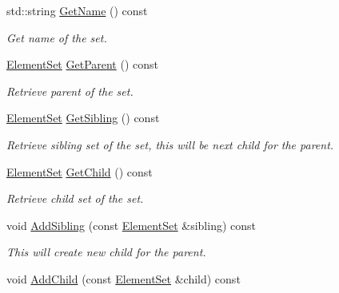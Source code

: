 \begin{DoxyCompactItemize}
\item 
\hypertarget{classINMOST_1_1ElementSet_ad40fe14ad7209c986897a8cd4560c6fd}{std\-::string \hyperlink{classINMOST_1_1ElementSet_ad40fe14ad7209c986897a8cd4560c6fd}{Get\-Name} () const }\label{classINMOST_1_1ElementSet_ad40fe14ad7209c986897a8cd4560c6fd}

\begin{DoxyCompactList}\small\item\em Get name of the set. \end{DoxyCompactList}\item 
\hypertarget{classINMOST_1_1ElementSet_ab38d00bdde98d5b56e93f4e57927339d}{\hyperlink{classINMOST_1_1ElementSet}{Element\-Set} \hyperlink{classINMOST_1_1ElementSet_ab38d00bdde98d5b56e93f4e57927339d}{Get\-Parent} () const }\label{classINMOST_1_1ElementSet_ab38d00bdde98d5b56e93f4e57927339d}

\begin{DoxyCompactList}\small\item\em Retrieve parent of the set. \end{DoxyCompactList}\item 
\hypertarget{classINMOST_1_1ElementSet_a9231fb92dc27a9127dc4f3c8d2e22f3e}{\hyperlink{classINMOST_1_1ElementSet}{Element\-Set} \hyperlink{classINMOST_1_1ElementSet_a9231fb92dc27a9127dc4f3c8d2e22f3e}{Get\-Sibling} () const }\label{classINMOST_1_1ElementSet_a9231fb92dc27a9127dc4f3c8d2e22f3e}

\begin{DoxyCompactList}\small\item\em Retrieve sibling set of the set, this will be next child for the parent. \end{DoxyCompactList}\item 
\hyperlink{classINMOST_1_1ElementSet}{Element\-Set} \hyperlink{classINMOST_1_1ElementSet_a0b56098516de44a89002a6ec26dbd926}{Get\-Child} () const 
\begin{DoxyCompactList}\small\item\em Retrieve child set of the set. \end{DoxyCompactList}\item 
\hypertarget{classINMOST_1_1ElementSet_a5e1ad74f8bee55d751929797e514fe25}{void \hyperlink{classINMOST_1_1ElementSet_a5e1ad74f8bee55d751929797e514fe25}{Add\-Sibling} (const \hyperlink{classINMOST_1_1ElementSet}{Element\-Set} \&sibling) const }\label{classINMOST_1_1ElementSet_a5e1ad74f8bee55d751929797e514fe25}

\begin{DoxyCompactList}\small\item\em This will create new child for the parent. \end{DoxyCompactList}\item 
\hypertarget{classINMOST_1_1ElementSet_a54777ea375b83b8eb181f65fef8f9cbb}{void \hyperlink{classINMOST_1_1ElementSet_a54777ea375b83b8eb181f65fef8f9cbb}{Add\-Child} (const \hyperlink{classINMOST_1_1ElementSet}{Element\-Set} \&child) const }\label{classINMOST_1_1ElementSet_a54777ea375b83b8eb181f65fef8f9cbb}


\end{DoxyCompactItemize}
